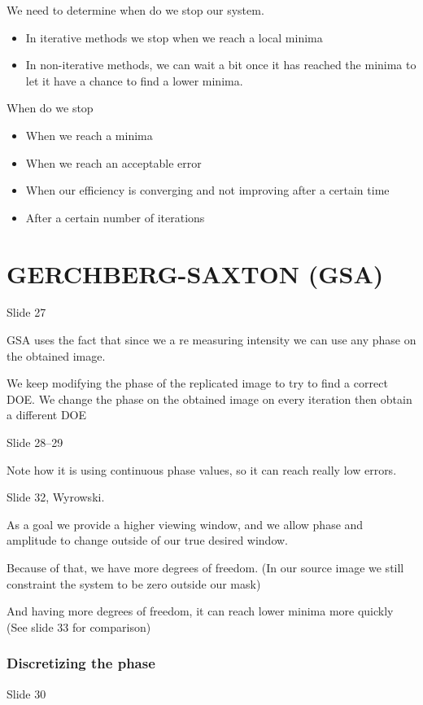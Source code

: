 \documentclass[../main/main.tex]{subfiles}
\begin{document}
We need to determine when do we stop our system.

\begin{itemize}
	\item In iterative methods we stop when we reach a local minima
	\item In non-iterative methods, we can wait a bit once it has reached the minima to let it have a chance to find a lower minima.
\end{itemize}

When do we stop
\begin{itemize}
	\item  When we reach a minima
	\item When we reach an acceptable error
	\item When our efficiency is converging and not improving after a certain time
	\item After a certain number of iterations
\end{itemize}


\section{GERCHBERG-SAXTON (GSA)}

Slide 27

GSA uses the fact that since we a re measuring intensity we can use any phase on the obtained image.

We keep modifying the phase of the replicated image to try to find a correct DOE. We change the phase on the obtained image on every iteration then obtain a different DOE

Slide 28--29

Note how it is using continuous phase values, so it can reach really low errors.

Slide 32, Wyrowski.

As a goal we provide a higher viewing window, and we allow phase and amplitude to change outside of our true desired window.

Because of that, we have more degrees of freedom. (In our source image we still constraint the system to be zero outside our mask)

And having more degrees of freedom, it can reach lower minima more quickly (See slide 33 for comparison)

\subsubsection{Discretizing the phase}
Slide 30
\end{document}
